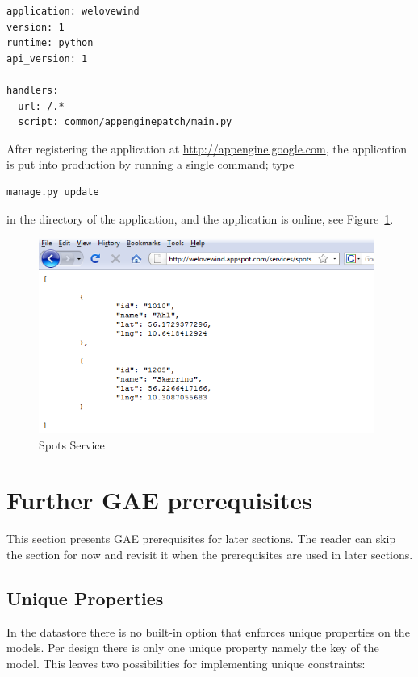 \begin{lstlisting}[caption=app.yaml configuration file,label=lst:app.yaml]
application: welovewind
version: 1
runtime: python
api_version: 1

handlers:
- url: /.*
  script: common/appenginepatch/main.py
\end{lstlisting}

After registering the application at \url{http://appengine.google.com}, the
application is put into production by running a single command; type
\begin{verbatim}
manage.py update
\end{verbatim}
in the directory of the application, and the application is online, see
Figure~\ref{fig:spots_service}.

\begin{figure}[htbp]
	\centering
	\includegraphics[width=11cm]{./Figures/spots_service}
	\caption{Spots Service}
	\label{fig:spots_service}
\end{figure}

\section{Further GAE prerequisites}
This section presents GAE prerequisites for later sections. The reader can skip
the section for now and revisit it when the prerequisites are used in later
sections.

\subsection{Unique Properties}\label{sec:unique_props}
In the datastore there is no built-in option that enforces unique properties on
the models. Per design there is only one unique property namely the key of the
model. This leaves two possibilities for implementing unique constraints:

